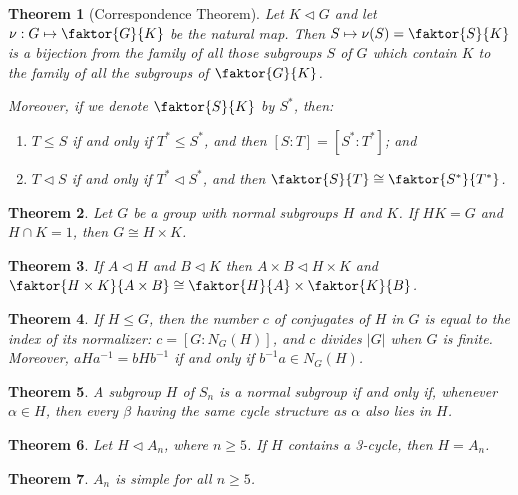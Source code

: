 \documentclass[12pt]{report}
\newtheorem{theorem}{Theorem}[chapter]
\theoremstyle{definition}
\begin{document}
\begin{theorem}[Correspondence Theorem]
	Let $K\vartriangleleft G$ and let $\nu:G\mapsto\faktor{G}{K}$ be the natural map.
	Then $S\mapsto\nu(S)=\faktor{S}{K}$ is a bijection from the family of all those subgroups $S$ of $G$ which contain $K$
	to the family of all the subgroups of $\faktor{G}{K}$.
	\par
	Moreover, if we denote $\faktor{S}{K}$ by $S^\ast$, then:
	\begin{enumerate}
		\item $T\leq S$ if and only if $T^\ast\leq S^\ast$, and then $[S:T]=[S^\ast:T^\ast]$; and
		\item $T\vartriangleleft S$ if and only if $T^\ast\vartriangleleft S^\ast$, and then $\faktor{S}{T}\cong\faktor{S^\ast}{T^\ast}$.
	\end{enumerate}
\end{theorem}

\begin{theorem}
	Let $G$ be a group with normal subgroups $H$ and $K$. If $HK=G$ and $H\cap K=1$, then $G\cong H\times K$.
\end{theorem}

\begin{theorem}
	If $A\vartriangleleft H$ and $B\vartriangleleft K$ then $A\times B\vartriangleleft H\times K$ and
	$\faktor{H\times K}{A\times B}\cong\faktor{H}{A}\times\faktor{K}{B}$.
\end{theorem}

\begin{theorem}
	If $H\leq G$, then the number $c$ of conjugates of $H$ in $G$ is equal to the index of its normalizer: $c=[G:N_G(H)]$, and $c$ divides $|G|$ when $G$ is finite.
	Moreover, $aHa^{-1}=bHb^{-1}$ if and only if $b^{-1}a\in N_G(H)$.
\end{theorem}

\begin{theorem}
	A subgroup $H$ of $S_n$ is a normal subgroup if and only if, whenever $\alpha\in H$, then every $\beta$ having the same
	cycle structure as $\alpha$ also lies in $H$.
\end{theorem}

\begin{theorem}
	Let $H\vartriangleleft A_n$, where $n\geq 5$. If $H$ contains a 3-cycle, then $H = A_n$.
\end{theorem}

\begin{theorem}
	$A_n$ is simple for all $n\geq 5$.
\end{theorem}
\end{document}
